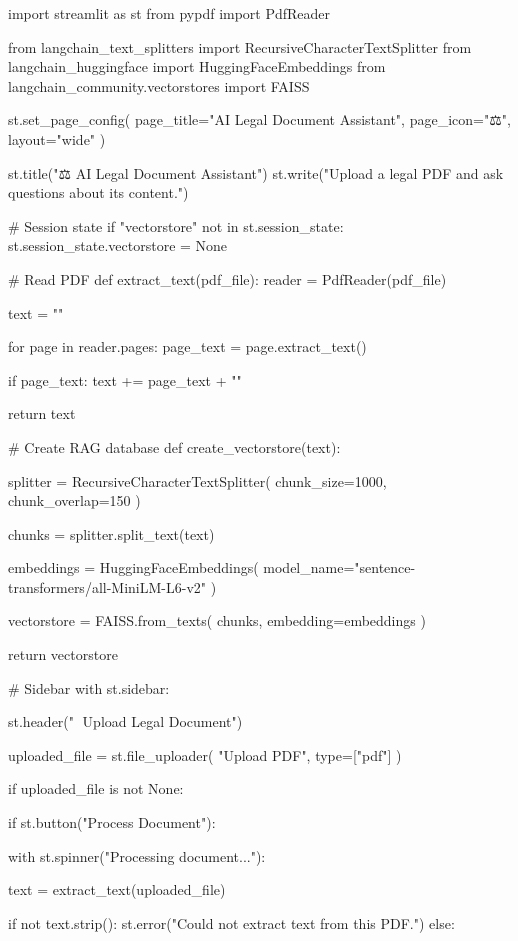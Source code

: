 import streamlit as st
from pypdf import PdfReader

from langchain_text_splitters import RecursiveCharacterTextSplitter
from langchain_huggingface import HuggingFaceEmbeddings
from langchain_community.vectorstores import FAISS

st.set_page_config(
    page_title="AI Legal Document Assistant",
    page_icon="⚖️",
    layout="wide"
)

st.title("⚖️ AI Legal Document Assistant")
st.write("Upload a legal PDF and ask questions about its content.")

# Session state
if "vectorstore" not in st.session_state:
    st.session_state.vectorstore = None


# Read PDF
def extract_text(pdf_file):
    reader = PdfReader(pdf_file)

    text = ""

    for page in reader.pages:
        page_text = page.extract_text()

        if page_text:
            text += page_text + "\n"

    return text


# Create RAG database
def create_vectorstore(text):

    splitter = RecursiveCharacterTextSplitter(
        chunk_size=1000,
        chunk_overlap=150
    )

    chunks = splitter.split_text(text)

    embeddings = HuggingFaceEmbeddings(
        model_name="sentence-transformers/all-MiniLM-L6-v2"
    )

    vectorstore = FAISS.from_texts(
        chunks,
        embedding=embeddings
    )

    return vectorstore


# Sidebar
with st.sidebar:

    st.header("📄 Upload Legal Document")

    uploaded_file = st.file_uploader(
        "Upload PDF",
        type=["pdf"]
    )

    if uploaded_file is not None:

        if st.button("Process Document"):

            with st.spinner("Processing document..."):

                text = extract_text(uploaded_file)

                if not text.strip():
                    st.error("Could not extract text from this PDF.")
                else:

